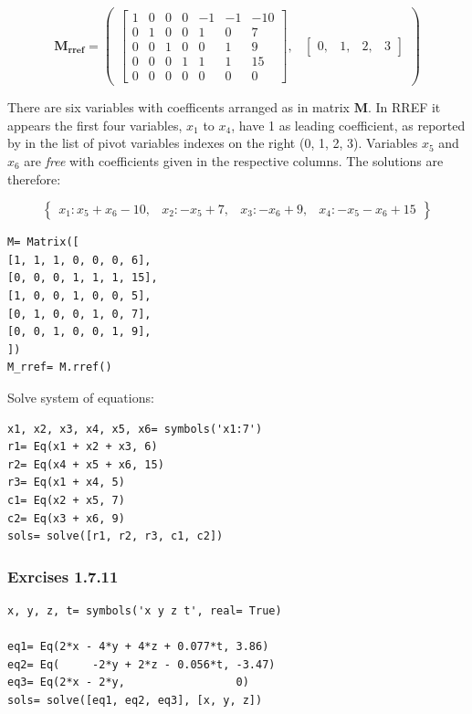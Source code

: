 \begin{equation}
\mathbf{M_{rref}}= \begin{pmatrix}\left[\begin{matrix}1 & 0 & 0 & 0 & -1 & -1 & -10\\0 & 1 & 0 & 0 & 1 & 0 & 7\\0 & 0 & 1 & 0 & 0 & 1 & 9\\0 & 0 & 0 & 1 & 1 & 1 & 15\\0 & 0 & 0 & 0 & 0 & 0 & 0\end{matrix}\right], & \begin{bmatrix}0, & 1, & 2, & 3\end{bmatrix}\end{pmatrix}
\end{equation}

There are six variables with coefficents arranged as in matrix $\mathbf{M}$. In
RREF it appears the first four variables, $x_1$ to $x_4$, have 1 as leading
coefficient, as reported by \sympy in the list of pivot variables indexes on the right
(0, 1, 2, 3). Variables $x_5$ and $x_6$ are \textit{free} with coefficients given
in the respective columns. The solutions are therefore:

\begin{equation}
\begin{Bmatrix}x_{1} : x_{5} + x_{6} - 10, & x_{2} : - x_{5} + 7, & x_{3} : - x_{6} + 9, & x_{4} : - x_{5} - x_{6} + 15\end{Bmatrix}
\end{equation}

\begin{verbatim}
M= Matrix([
[1, 1, 1, 0, 0, 0, 6],
[0, 0, 0, 1, 1, 1, 15],
[1, 0, 0, 1, 0, 0, 5],
[0, 1, 0, 0, 1, 0, 7],
[0, 0, 1, 0, 0, 1, 9],
])
M_rref= M.rref()
\end{verbatim}

Solve system of equations:

\begin{verbatim}
x1, x2, x3, x4, x5, x6= symbols('x1:7')
r1= Eq(x1 + x2 + x3, 6)
r2= Eq(x4 + x5 + x6, 15)
r3= Eq(x1 + x4, 5)
c1= Eq(x2 + x5, 7)
c2= Eq(x3 + x6, 9)
sols= solve([r1, r2, r3, c1, c2])
\end{verbatim}

\subsubsection{Exrcises 1.7.11}

\begin{verbatim}
x, y, z, t= symbols('x y z t', real= True)

eq1= Eq(2*x - 4*y + 4*z + 0.077*t, 3.86)
eq2= Eq(     -2*y + 2*z - 0.056*t, -3.47)
eq3= Eq(2*x - 2*y,                 0)
sols= solve([eq1, eq2, eq3], [x, y, z])
\end{verbatim}

